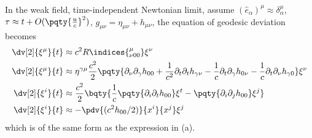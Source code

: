 \documentclass[12pt]{article}
\begin{document}
        \subsubsection{} In the weak field, time-independent Newtonian limit, assume \((\hat{e}_\alpha)^\mu \approx \delta_{\alpha}^\mu\), \(\tau \approx t + O(\pqty{\frac{u}{c}}^2)\), \(g_{\mu\nu} = \eta_{\mu\nu} + h_{\mu\nu}\), the equation of geodesic deviation becomes \begin{align*}
            \dv[2]{\xi^\mu}{t} &\approx  c^2 R\indices{_{\nu 00}^\mu} \xi^{\nu}\\
            \dv[2]{\xi^\mu}{t} &\approx  \eta^{\gamma \mu}\frac{c^2}{2} \pqty{\partial_\nu\partial_\gamma h_{00} + \frac{1}{c^2}\partial_ t\partial_t h_{\gamma\nu} - \frac{1}{c}\partial_t\partial_\gamma h_{0\nu} - \frac{1}{c}\partial_t \partial_\nu h_{\gamma 0}} \xi^{\nu}\\
            \dv[2]{\xi^i}{t} &\approx \frac{c^2}{2}\bqty{\frac{1}{c}\pqty{\partial_i\partial_t h_{00}}\xi^{t} -\pqty{\partial_i\partial_j h_{00}}\xi^{j} }\\
            \dv[2]{\xi^i}{t} &\approx - \pdv{(c^2h_{00}  /2)}{x^i}{x^j} \xi^{j}
        \end{align*}
        which is of the same form as the expression in (a).
\end{document}
